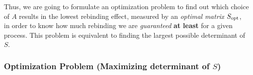 Thus, we are going to formulate an optimization problem to find out which choice of $A$ results in the lowest
rebinding effect, measured by an \textit{optimal matrix} $S_{\mathrm{opt}}$, in order to know how much rebinding we are \textit{guaranteed} \textbf{at least} for a given process.
This problem is equivalent to finding the largest possible determinant of $S$.

\subsubsection*{Optimization Problem (Maximizing determinant of $S$)}

